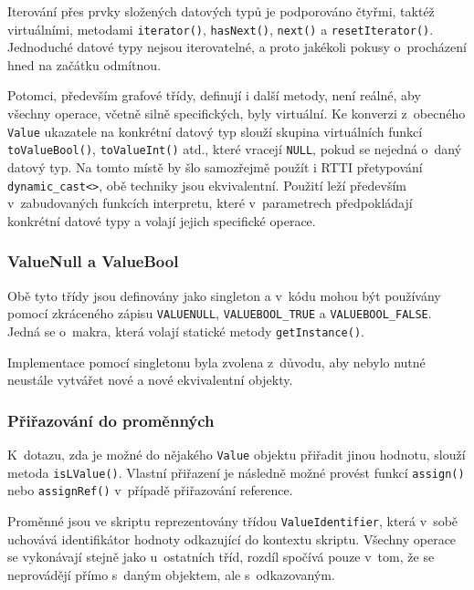 \documentclass[11pt,twoside,a4paper]{book}
\begin{document}
Iterování přes prvky složených datových typů je podporováno čtyřmi, taktéž virtuálními, metodami \texttt{iterator()}, \texttt{hasNext()}, \texttt{next()} a \texttt{resetIterator()}. Jednoduché datové typy nejsou iterovatelné, a proto jakékoli pokusy o~procházení hned na začátku odmítnou.

Potomci, především grafové třídy, definují i další metody, není reálné, aby všechny operace, včetně silně specifických, byly virtuální. Ke konverzi z~obecného \texttt{Value} ukazatele na konkrétní datový typ slouží skupina virtuálních funkcí \texttt{toValueBool()}, \texttt{toValueInt()} atd., které vracejí \texttt{NULL}, pokud se nejedná o~daný datový typ. Na tomto místě by šlo samozřejmě použít i RTTI přetypování \texttt{dynamic\_cast<>}, obě techniky jsou ekvivalentní. Použití leží především v~zabudovaných funkcích interpretu, které v~parametrech předpokládají konkrétní datové typy a volají jejich specifické operace.


\subsubsection{ValueNull a ValueBool}

Obě tyto třídy jsou definovány jako singleton a v~kódu mohou být používány pomocí zkrá\-ce\-né\-ho zápisu \texttt{VALUENULL}, \texttt{VALUEBOOL\_TRUE} a \texttt{VALUEBOOL\_FALSE}. Jedná se o~makra, která volají statické metody \texttt{getInstance()}.

Implementace pomocí singletonu byla zvolena z~důvodu, aby nebylo nutné neustále vytvářet nové a nové ekvivalentní objekty.


\subsubsection{Přiřazování do proměnných}
\label{valuereference_a_prirazovani_do_promennych}

K~dotazu, zda je možné do nějakého \texttt{Value} objektu přiřadit jinou hodnotu, slouží metoda \texttt{isLValue()}. Vlastní přiřazení je následně možné provést funkcí \texttt{assign()} nebo \texttt{assignRef()} v~případě přiřazování reference.

Proměnné jsou ve skriptu reprezentovány třídou \texttt{ValueIdentifier}, která v~sobě u\-cho\-vá\-vá identifikátor hodnoty odkazující do kontextu skriptu. Všechny operace se vykonávají stejně jako u~ostatních tříd, rozdíl spočívá pouze v~tom, že se neprovádějí přímo s~daným objektem, ale s~odkazovaným.
\end{document}
